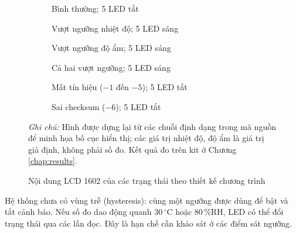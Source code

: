 \begin{figure}[H]
    \centering
    \begin{subfigure}[t]{0.48\textwidth}\centering
        \caption{Bình thường; 5 LED tắt}
    \end{subfigure}\hfill
    \begin{subfigure}[t]{0.48\textwidth}\centering
        \caption{Vượt ngưỡng nhiệt độ; 5 LED sáng}
    \end{subfigure}

    \vspace{0.35cm}
    \begin{subfigure}[t]{0.48\textwidth}\centering
        \caption{Vượt ngưỡng độ ẩm; 5 LED sáng}
        \label{fig:lcd-humi}
    \end{subfigure}\hfill
    \begin{subfigure}[t]{0.48\textwidth}\centering
        \caption{Cả hai vượt ngưỡng; 5 LED sáng}
    \end{subfigure}

    \vspace{0.35cm}
    \begin{subfigure}[t]{0.48\textwidth}\centering
        \caption{Mất tín hiệu ($-1$ đến $-5$); 5 LED tắt}
    \end{subfigure}\hfill
    \begin{subfigure}[t]{0.48\textwidth}\centering
        \caption{Sai checksum ($-6$); 5 LED tắt}
    \end{subfigure}
    \caption{Nội dung LCD 1602 của các trạng thái theo thiết kế chương trình}
    \label{fig:lcd-states}
    \vspace{0.1cm}
    {\small\textit{Ghi chú:} Hình được dựng lại từ các chuỗi định dạng trong mã nguồn để minh họa bố cục hiển thị; các giá trị nhiệt độ, độ ẩm là giá trị giả định, không phải số đo. Kết quả đo trên kit ở Chương \ref{chap:results}.\par}
\end{figure}

Hệ thống chưa có vùng trễ (hysteresis): cùng một ngưỡng được dùng để bật và tắt cảnh báo. Nếu số đo dao động quanh 30\,$^\circ$C hoặc 80\,\%RH, LED có thể đổi trạng thái qua các lần đọc. Đây là hạn chế cần khảo sát ở các điểm sát ngưỡng.

